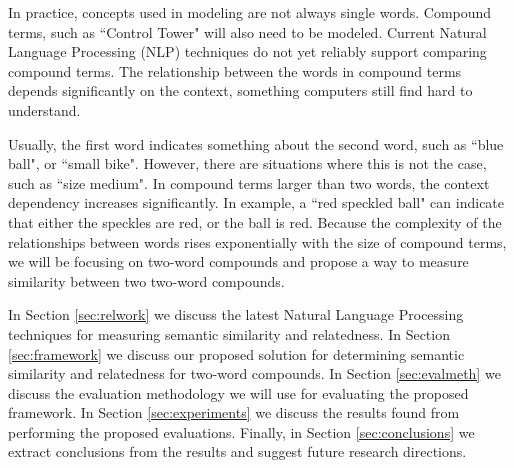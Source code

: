 \documentclass{article}
\begin{document}
In practice, concepts used in modeling are not always single words. Compound terms, such as ``Control Tower" will also need to be modeled. Current Natural Language Processing (NLP) techniques do not yet reliably support comparing compound terms. The relationship between the words in compound terms depends significantly on the context, something computers still find hard to understand. 

Usually, the first word indicates something about the second word, such as ``blue ball", or ``small bike". However, there are situations where this is not the case, such as ``size medium". In compound terms larger than two words, the context dependency increases significantly. In example, a ``red speckled ball" can indicate that either the speckles are red, or the ball is red. Because the complexity of the relationships between words rises exponentially with the size of compound terms, we will be focusing on two-word compounds and propose a way to measure similarity between two two-word compounds.

In Section \ref{sec:relwork} we discuss the latest Natural Language Processing techniques for measuring semantic similarity and relatedness. In Section \ref{sec:framework} we discuss our proposed solution for determining semantic similarity and relatedness for two-word compounds. In Section \ref{sec:evalmeth} we discuss the evaluation methodology we will use for evaluating the proposed framework. In Section \ref{sec:experiments} we discuss the results found from performing the proposed evaluations. Finally, in Section \ref{sec:conclusions} we extract conclusions from the results and suggest future research directions.


\end{document}
